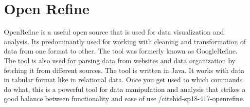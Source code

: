\section{Open Refine}

OpenRefine is a useful open source that is used for data visualization and analysis. 
Its predominantly used for working with cleaning and transformation of data from one format to other.
The tool was formerly known as GoogleRefine. The tool is also used for parsing data from websites and data organization
by fetching it from different sources. The tool is written in Java. It works with data in tabular format like in relational data.
Once you get used to which commands do what, this is a powerful tool for data manipulation and analysis
that strikes a good balance between functionality and ease of use /cite{hid-sp18-417-openrefine}.

